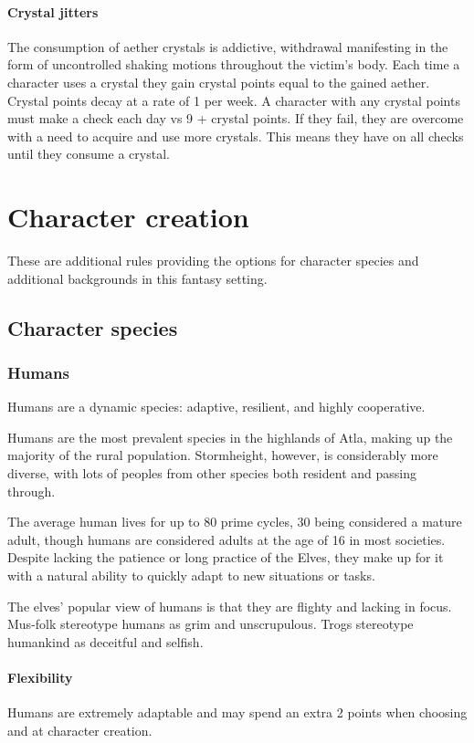 \documentclass[a4paper,11pt,oneside]{book}
\newcommand{\textlf}[1]{\textbf{\titlecap{#1}}}
\begin{document}
\subsubsection{Crystal jitters}
The consumption of aether crystals is addictive, withdrawal manifesting in the form of uncontrolled shaking motions throughout the victim's body. Each time a character uses a crystal they gain crystal points equal to the gained aether. Crystal points decay at a rate of 1 per week. A character with any crystal points must make a \textlf{resolve} check each day vs 9 + crystal points. If they fail, they are overcome with a need to acquire and use more crystals. This means they have \textlf{edge-} on all checks until they consume a crystal.   




\chapter{Character creation}
These are additional rules providing the options for character species and additional backgrounds in this fantasy setting.

\section{Character species}

\subsection{Humans}
Humans are a dynamic species: adaptive, resilient, and highly cooperative.

Humans are the most prevalent species in the highlands of Atla, making up the majority of the rural population. Stormheight, however, is considerably more diverse, with lots of peoples from other species both resident and passing through.

The average human lives for up to 80 prime cycles, 30 being considered a mature adult, though humans are considered adults at the age of 16 in most societies. Despite lacking the patience or long practice of the Elves, they make up for it with a natural ability to quickly adapt to new situations or tasks. 

The elves' popular view of humans is that they are flighty and lacking in focus. Mus-folk stereotype humans as grim and unscrupulous. Trogs stereotype humankind as deceitful and selfish.  

\subsubsection*{Flexibility}
Humans are extremely adaptable and may spend an extra 2 points when choosing \textlf{perks} and \textlf{proficiencies} at character creation.
\end{document}

